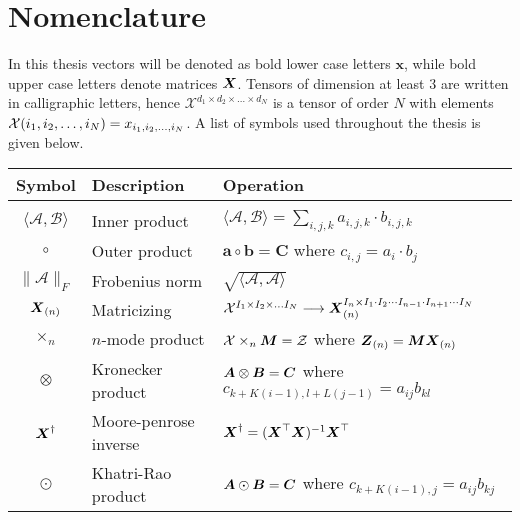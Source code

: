 \section{Nomenclature}

In this thesis vectors will be denoted as bold lower case letters $\boldsymbol{x}$, while bold upper case letters denote matrices $\boldsymbol{X}$. Tensors of dimension at least 3 are written in calligraphic letters, hence $\mathcal{X}^{d_1\times d_2 \times \dots \times d_N}$ is a tensor of order $N$ with elements $\mathcal{X}(i_1, i_2, \dots, i_N) = x_{i_1, i_2, \dots, i_N}$. A list of symbols used throughout the thesis is given below. 

\vspace{1cm}

\begin{tabular}{cll}
    \textbf{Symbol} & \textbf{Description} & \textbf{Operation}  \\ \hline
    & & \\
    $\langle \mathcal{A}, \mathcal{B}\rangle$ & Inner product & $\langle \mathcal{A}, \mathcal{B}\rangle = \sum_{i,j,k} a_{i,j,k}\cdot b_{i,j,k}$ \\[2ex]
    $\circ$ &  Outer product & $\boldsymbol{a} \circ \boldsymbol{b} = \boldsymbol{C}$ where $c_{i,j} = a_i \cdot b_j$ \\[2ex]
    $\| \mathcal{A} \|_F$ & Frobenius norm & $\sqrt{\langle \mathcal{A}, \mathcal{A}\rangle}$ \\
    $\boldsymbol{X}_{(n)}$ & Matricizing & $\mathcal{X}^{I_1 \times I_2 \times \dots I_N} \longrightarrow \boldsymbol{X}_{(n)}^{I_n \times I_1 \cdot I_2 \cdots I_{n-1} \cdot I_{n+1} \cdots I_N}$ \\[2ex]
    $\times_n$ & $n$-mode product & $\mathcal{X}\times_n \boldsymbol{M} = \mathcal{Z}$ where $\boldsymbol{Z}_{(n)} = \boldsymbol{M}\boldsymbol{X}_{(n)}$ \\[2ex]
    $\otimes$ & Kronecker product & $\boldsymbol{A}\otimes \boldsymbol{B} = \boldsymbol{C}$ where $c_{k + K(i-1), l + L(j-1)} = a_{ij}b_{kl}$ \\[2ex]
    $\boldsymbol{X}^{\dagger}$ & Moore-penrose inverse & $\boldsymbol{X}^{\dagger} = ( \boldsymbol{X}^\top \boldsymbol{X})^{-1}\boldsymbol{X}^{\top}$ \\[2ex]
    $\odot$ & Khatri-Rao product & $\boldsymbol{A} \odot \boldsymbol{B} = \boldsymbol{C}$ where $c_{k + K(i-1), j} = a_{ij}b_{kj}$
\end{tabular}